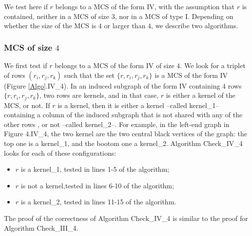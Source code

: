 \documentclass{article}
\begin{document}
We test here if $r$ belongs to a MCS of the form IV, with the assumption that  
$r$ is contained, neither in a MCS of size $3$, nor in a MCS of type I.
Depending on whether the size of the MCS is $4$ or larger than $4$, 
we describe two algorithms.

\subsubsection{MCS of size $4$}

We first test if $r$ belongs to a MCS of the form IV of size $4$.
We look for a triplet of rows $(r_i,r_j,r_k)$ such that 
the set $\{r,r_i,r_j,r_k\}$ is a MCS of the form IV (Figure \ref{Algo}.IV\_4).
In an induced subgraph of the form IV containing $4$ rows  $\{r,r_i,r_j,r_k\}$, 
two rows are kernels, and in that case, $r$ is either a kernel of the MCS, 
or not. If $r$ is a kernel, then it is either a kernel --called kernel\_1-- 
containing a column of the induced subgraph that is not shared with any 
of the other rows , or not --called kernel\_2--. For example, in the 
left-end graph in Figure 4.IV\_4, the two kernel are the two central black
vertices of the graph: the top one is a kernel\_1, and the bootom one a
 kernel\_2.
Algorithm \mbox{Check\_IV\_4} looks for each of these configurations: 
\begin{itemize}
\item  $r$ is a kernel\_1, tested in lines 1-5 of the algorithm;  
\item $r$ is not a kernel,tested in lines 6-10 of the algorithm; 
\item $r$ is a kernel\_2, tested in lines 11-15 of the algorithm.
\end{itemize}
The proof of the correctness of Algorithm \mbox{Check\_IV\_4} is similar to the
proof for Algorithm \mbox{Check\_III\_4}.
\end{document}
